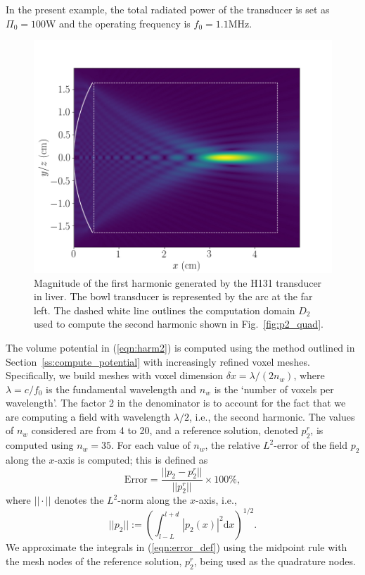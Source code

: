 \documentclass[preprint]{JASA}
\newcommand{\sd}{\mbox{d}}
\begin{document}
In the present example, the total radiated power of the
transducer is set as $\Pi_0 = 100$W and the operating frequency is $f_0=1.1$MHz.
\begin{figure}[h!]
    \centering
    \includegraphics[width=\linewidth]{figures/H131_abs}
    \caption{Magnitude of the first harmonic generated by the H131 transducer
    in liver. The bowl transducer is represented by the arc at the far left.
    The dashed white line outlines the computation domain $D_2$ used to compute
    the second harmonic shown in Fig.~\ref{fig:p2_quad}.}
    \label{fig:H131_p1}
\end{figure}

The volume potential in (\ref{eqn:harm2}) is computed using the method outlined 
in Section~\ref{ss:compute_potential} with increasingly refined voxel meshes.
Specifically, we build meshes with voxel dimension $\delta x = \lambda / (2n_w)$,
where $\lambda = c / f_0$ is the fundamental wavelength and $n_w$ is the 
`number of voxels per wavelength'. The factor 2 in the denominator is to account
for the fact that we are computing a field with wavelength $\lambda/2$, i.e.,
the second harmonic. The values of $n_w$ considered are from 4 to 20, and a 
reference solution, denoted $p_2^r$, is computed using $n_w=35$. For each value 
of $n_w$, the relative $L^2$-error of the field $p_2$ along the $x$-axis is 
computed; this is defined as
\begin{equation}
    \text{Error} = \frac{||p_2 - p_2^r||}{||p_2^r||}\times 100\%,
    \label{eqn:error_def}
\end{equation}
where $||\cdot||$ denotes the $L^2$-norm along the $x$-axis, i.e., 
\begin{equation}
    ||p_2|| := \left(\int_{l-L}^{l+d}|p_2(x)|^2\sd x\right)^{1/2}.
\end{equation}
We approximate the integrals in (\ref{eqn:error_def}) using the midpoint rule
with the mesh nodes of the reference solution, $p_2^r$, being used as the 
quadrature nodes.
\end{document}
